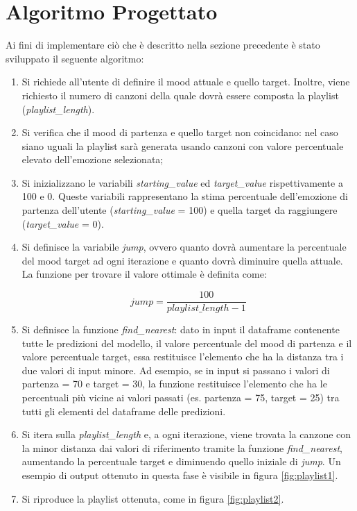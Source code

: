 \documentclass[11pt]{report}
\begin{document}
\section{Algoritmo Progettato}

Ai fini di implementare ciò che è descritto nella sezione precedente è stato sviluppato il seguente algoritmo:
\begin{enumerate}

    \item Si richiede all'utente di definire il mood attuale e quello target. Inoltre, viene richiesto il numero di canzoni della quale dovrà essere composta la playlist (\textit{playlist\_length}).

    \item Si verifica che il mood di partenza e quello target non coincidano: nel caso siano uguali la playlist sarà generata usando canzoni con valore percentuale elevato dell'emozione selezionata;
    
    \item Si inizializzano le variabili \textit{starting\_value} ed \textit{target\_value} rispettivamente a 100 e 0. Queste variabili rappresentano la stima percentuale dell'emozione di partenza dell'utente (\textit{starting\_value} = 100) e quella target da raggiungere (\textit{target\_value} = 0).
    
    \item Si definisce la variabile \textit{jump}, ovvero quanto dovrà aumentare la percentuale del mood target ad ogni iterazione e quanto dovrà diminuire quella attuale. La funzione per trovare il valore ottimale è definita come:
    
    \begin{equation}
jump = \frac{100}{playlist\_length - 1}
    \end{equation}
    
    
    
    \item Si definisce la funzione \textit{find\_nearest}: dato in input il dataframe contenente tutte le predizioni del modello, il valore percentuale del mood di partenza e il valore percentuale target, essa restituisce l'elemento che ha la distanza tra i due valori di input minore. Ad esempio, se in input si passano i valori di partenza = 70 e target = 30, la funzione restituisce l'elemento che ha le percentuali più vicine ai valori passati (es. partenza = 75, target = 25) tra tutti gli elementi del dataframe delle predizioni. 
    
    \item Si itera sulla \textit{playlist\_length} e, a ogni iterazione, viene trovata la canzone con la minor distanza dai valori di riferimento tramite la funzione \textit{find\_nearest}, aumentando la percentuale target e diminuendo quello iniziale di \textit{jump}. Un esempio di output ottenuto in questa fase è visibile in figura \ref{fig:playlist1}.
    
    \item Si riproduce la playlist ottenuta, come in figura \ref{fig:playlist2}.
\end{enumerate}
\end{document}
